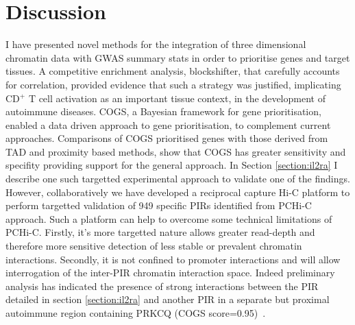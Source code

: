 \documentclass[a4paper,11pt]{report}
\begin{document}

\chapter{Discussion}

I have presented novel methods for the integration of three dimensional chromatin data with GWAS summary stats in order to prioritise genes and target tissues. A competitive enrichment analysis, blockshifter, that carefully accounts for correlation, provided evidence that such a strategy was justified, implicating CD${^+}$ T cell activation as an important tissue context, in the development of autoimmune diseases.  COGS, a Bayesian framework for gene  prioritisation, enabled a data driven approach to gene prioritisation, to complement current approaches.  Comparisons of COGS prioritised genes with those derived from TAD and proximity based methods,  show that COGS has greater sensitivity and specifity providing support for the general approach.  In Section \ref{section:il2ra} I describe one such targetted experimental approach to validate one of the findings. However, collaboratively we have developed a reciprocal capture Hi-C platform to perform targetted validation of 949 specific PIRs identified from PCHi-C approach. Such a platform can  help to overcome some technical limitations of PCHi-C. Firstly, it's more targetted nature allows greater read-depth and therefore more sensitive detection of less stable or prevalent chromatin interactions. Secondly, it is not confined to promoter interactions and will allow interrogation of the inter-PIR chromatin interaction space. Indeed preliminary analysis has indicated the presence of strong interactions between the PIR detailed in section \ref{section:il2ra} and another PIR in a separate but proximal autoimmune region containing PRKCQ (COGS score=0.95)~\citep{LoweCooperBruskoEtAl2007}. 
\end{document}

